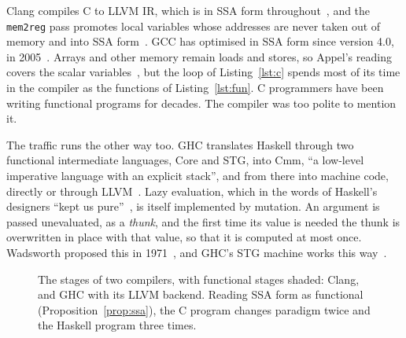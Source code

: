 \documentclass[11pt]{article}
\theoremstyle{definition}
\theoremstyle{remark}
\begin{document}
\medskip
Clang compiles C to LLVM IR, which is in SSA form
throughout~\cite{llvm}, and the \texttt{mem2reg} pass promotes local
variables whose addresses are never taken out of memory and into SSA
form~\cite{mem2reg}. GCC has optimised in SSA form since version 4.0, in
2005~\cite{gcc4}. Arrays and other memory remain loads and stores, so
Appel's reading covers the scalar variables~\cite{appel}, but the loop of
Listing~\ref{lst:c} spends most of its time in the compiler as the
functions of Listing~\ref{lst:fun}. C programmers have been writing
functional programs for decades. The compiler was too polite to mention
it.

The traffic runs the other way too. GHC translates Haskell through two
functional intermediate languages, Core and STG, into Cmm, ``a low-level
imperative language with an explicit stack'', and from there into
machine code, directly or through LLVM~\cite{ghc}. Lazy evaluation, which
in the words of Haskell's designers ``kept us pure''~\cite{history}, is
itself implemented by mutation. An argument is passed unevaluated, as a
\emph{thunk}, and the first time its value is needed the thunk is
overwritten in place with that value, so that it is computed at most
once. Wadsworth proposed this in 1971~\cite{wadsworth}, and GHC's STG
machine works this way~\cite{stg}.

\begin{figure}[ht]
  \centering
  \caption{The stages of two compilers, with functional stages shaded:
    Clang, and GHC with its LLVM backend. Reading SSA form as functional
    (Proposition~\ref{prop:ssa}), the C program changes paradigm twice and
  the Haskell program three times.}\label{fig:pipeline}
\end{figure}
\end{document}
